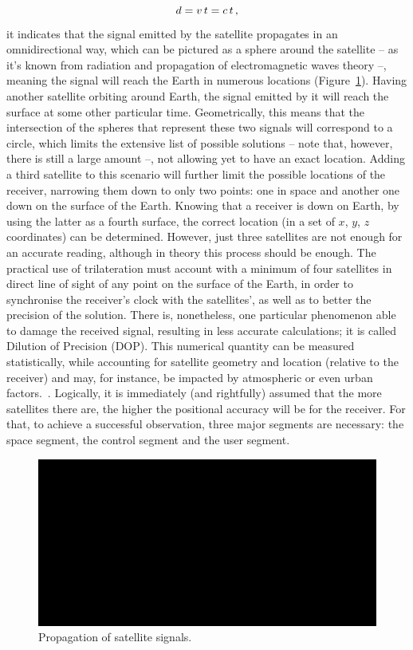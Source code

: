 \begin{equation}
    d = v\,t = c\,t\,,\medskip
\end{equation}
it indicates that the signal emitted by the satellite propagates in an omnidirectional way, which can be pictured as a sphere around the satellite -- as it's known from radiation and propagation of electromagnetic waves theory --, meaning the signal will reach the Earth in numerous locations (Figure~\ref{fig:omnidirectional}).
Having another satellite orbiting around Earth, the signal emitted by it will reach the surface at some other particular time. Geometrically, this means that the intersection of the spheres that represent these two signals will correspond to a circle, which limits the extensive list of possible solutions -- note that, however, there is still a large amount --, not allowing yet to have an exact location. Adding a third satellite to this scenario will further limit the possible locations of the receiver, narrowing them down to only two points: one in space and another one down on the surface of the Earth. Knowing that a receiver is down on Earth, by using the latter as a fourth surface, the correct location (in a set of $x$, $y$, $z$ coordinates) can be determined.
However, just three satellites are not enough for an accurate reading, although in theory this process should be enough. The practical use of trilateration must account with a minimum of four satellites in direct line of sight of any point on the surface of the Earth, in order to synchronise the receiver's clock with the satellites', as well as to better the precision of the solution.
There is, nonetheless, one particular phenomenon able to damage the received signal, resulting in less accurate calculations; it is called Dilution of Precision (DOP). This numerical quantity can be measured statistically, while accounting for satellite geometry and location (relative to the receiver) and may, for instance, be impacted by atmospheric or even urban factors.~\cite{novatel_gnss, ayers_geosystems_2011}.
Logically, it is immediately (and rightfully) assumed that the more satellites there are, the higher the positional accuracy will be for the receiver. For that, to achieve a successful observation, three major segments are necessary: the space segment, the control segment and the user segment.
\begin{figure}[htbp]
	\centering
	\includegraphics[width=1.0\textwidth]{Chapters/Figures/demo.png}
	\caption{Propagation of satellite signals.}
	\label{fig:omnidirectional}
\end{figure}

